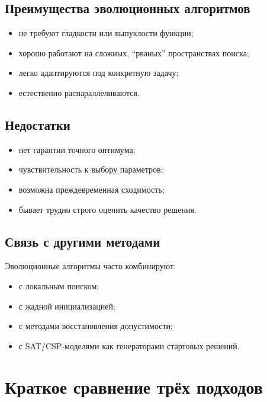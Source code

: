 \documentclass[12pt,a4paper]{article}
\theoremstyle{definition}
\theoremstyle{plain}
\begin{document}
\subsection{Преимущества эволюционных алгоритмов}
\begin{itemize}
\item не требуют гладкости или выпуклости функции;
\item хорошо работают на сложных, ``рваных'' пространствах поиска;
\item легко адаптируются под конкретную задачу;
\item естественно распараллеливаются.
\end{itemize}

\subsection{Недостатки}
\begin{itemize}
\item нет гарантии точного оптимума;
\item чувствительность к выбору параметров;
\item возможна преждевременная сходимость;
\item бывает трудно строго оценить качество решения.
\end{itemize}

\subsection{Связь с другими методами}
Эволюционные алгоритмы часто комбинируют:
\begin{itemize}
\item с локальным поиском;
\item с жадной инициализацией;
\item с методами восстановления допустимости;
\item с SAT/CSP-моделями как генераторами стартовых решений.
\end{itemize}

\section{Краткое сравнение трёх подходов}
\end{document}
